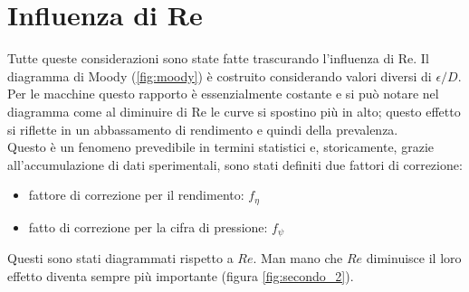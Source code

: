 \section{Influenza di Re}
Tutte queste considerazioni sono state fatte trascurando l'influenza di Re. Il diagramma di Moody (\ref{fig:moody}) è costruito considerando valori diversi di $\epsilon/D$. Per le macchine questo rapporto è essenzialmente costante e si può notare nel diagramma come al diminuire di Re le curve si spostino più in alto; questo effetto si riflette in un abbassamento di rendimento e quindi della prevalenza.\\
Questo è un fenomeno prevedibile in termini statistici e, storicamente, grazie all'accumulazione di dati sperimentali, sono stati definiti due fattori di correzione:
\begin{itemize}
	\item fattore di correzione per il rendimento: $f_\eta$
	\item fatto di correzione per la cifra di pressione: $f_\psi$
\end{itemize} 
Questi sono stati diagrammati rispetto a $Re$. Man mano che $Re$ diminuisce il loro effetto diventa sempre più importante (figura \ref{fig:secondo_2}). 

